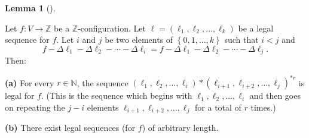 \documentclass[numbers=enddot,12pt,final,onecolumn,notitlepage]{scrartcl}%
\theoremstyle{definition}
\newtheorem{lem}[theo]{Lemma}
\newenvironment{lemma}[1][]
{\begin{lem}[#1]\begin{leftbar}}
{\end{leftbar}\end{lem}}
\newcommand{\ZZ}{\mathbb{Z}}
\newcommand{\set}[1]{\left\{ #1 \right\}}
\begin{document}
\begin{lemma} \label{lem.chip.leg-repeat}
Let $f : V \to \ZZ$ be a $\ZZ$-configuration.
Let $\ell=\left(  \ell_{1},\ell_{2},\ldots,\ell_{k}\right)  $
be a legal sequence for $f$.
Let $i$ and $j$ be two elements of $\set{0, 1, \ldots, k}$ such that
$i < j$ and
\begin{equation}
f-\Delta\ell_{1}-\Delta\ell_{2}-\cdots-\Delta\ell_{i}=f-\Delta\ell_{1}%
-\Delta\ell_{2}-\cdots-\Delta\ell_{j}.\label{eq.lem.chip.leg-repeat.cond}%
\end{equation}
Then:

\textbf{(a)} For every $r\in\mathbb{N}$, the sequence $\left(  \ell_{1}%
,\ell_{2},\ldots,\ell_{i}\right)  \ast\left(  \ell_{i+1},\ell_{i+2}%
,\ldots,\ell_{j}\right)  ^{\ast r}$ is legal for $f$. (This is the sequence
which begins with $\ell_{1},\ell_{2},\ldots,\ell_{i}$ and then goes on
repeating the $j-i$ elements $\ell_{i+1},\ell_{i+2},\ldots,\ell_{j}$ for a
total of $r$ times.)

\textbf{(b)} There exist legal sequences (for $f$) of arbitrary length.
\end{lemma}
\end{document}
